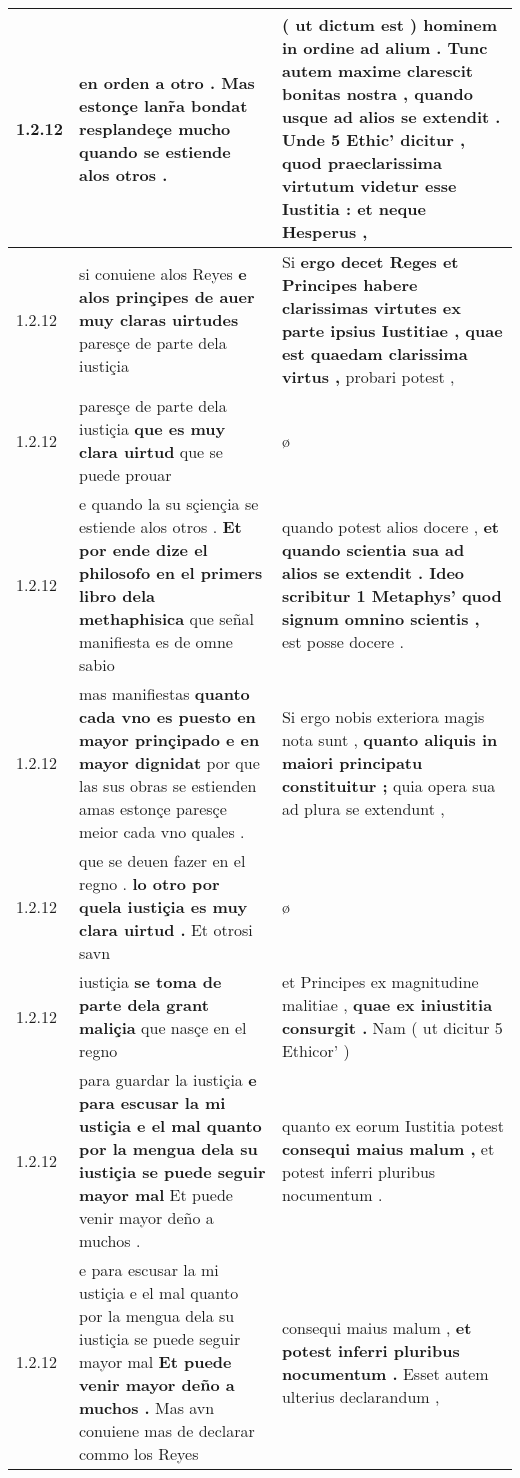 \begin{tabular}{|p{1cm}|p{6.5cm}|p{6.5cm}|}
1.2.12 & en orden a otro . \textbf{ Mas estonçe lanr̃a bondat resplandeçe mucho } quando se estiende alos otros . & ( ut dictum est ) hominem in ordine ad alium . Tunc autem maxime clarescit bonitas nostra , quando usque ad alios se extendit . Unde 5 Ethic’ dicitur , \textbf{ quod praeclarissima virtutum videtur esse Iustitia : } et neque Hesperus , \\\hline
1.2.12 & si conuiene alos Reyes \textbf{ e alos prinçipes de auer muy claras uirtudes } paresçe de parte dela iustiçia & Si \textbf{ ergo decet Reges et Principes habere clarissimas virtutes ex parte ipsius Iustitiae , quae est quaedam clarissima virtus , } probari potest , \\\hline
1.2.12 & paresçe de parte dela iustiçia \textbf{ que es muy clara uirtud } que se puede prouar & ø \\\hline
1.2.12 & e quando la su sçiençia se estiende alos otros . \textbf{ Et por ende dize el philosofo en el primers libro dela methaphisica } que señal manifiesta es de omne sabio & quando potest alios docere , \textbf{ et quando scientia sua ad alios se extendit . Ideo scribitur 1 Metaphys’ quod signum omnino scientis , } est posse docere . \\\hline
1.2.12 & mas manifiestas \textbf{ quanto cada vno es puesto en mayor prinçipado e en mayor dignidat } por que las sus obras se estienden amas estonçe paresçe meior cada vno quales . & Si ergo nobis exteriora magis nota sunt , \textbf{ quanto aliquis in maiori principatu constituitur ; } quia opera sua ad plura se extendunt , \\\hline
1.2.12 & que se deuen fazer en el regno . \textbf{ lo otro por quela iustiçia es muy clara uirtud . } Et otrosi savn & ø \\\hline
1.2.12 & iustiçia \textbf{ se toma de parte dela grant maliçia } que nasçe en el regno & et Principes ex magnitudine malitiae , \textbf{ quae ex iniustitia consurgit . } Nam ( ut dicitur 5 Ethicor’ ) \\\hline
1.2.12 & para guardar la iustiçia \textbf{ e para escusar la mi ustiçia e el mal quanto por la mengua dela su iustiçia se puede seguir mayor mal } Et puede venir mayor deño a muchos . & quanto ex eorum Iustitia potest \textbf{ consequi maius malum , } et potest inferri pluribus nocumentum . \\\hline
1.2.12 & e para escusar la mi ustiçia e el mal quanto por la mengua dela su iustiçia se puede seguir mayor mal \textbf{ Et puede venir mayor deño a muchos . } Mas avn conuiene mas de declarar commo los Reyes & consequi maius malum , \textbf{ et potest inferri pluribus nocumentum . } Esset autem ulterius declarandum , \\\hline

\end{tabular}
